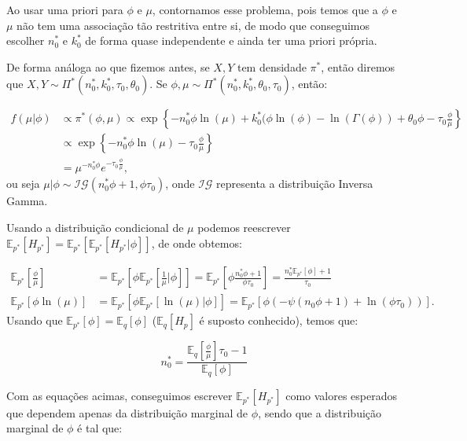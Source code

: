 \documentclass[
]{article}
\begin{document}
Ao usar uma priori para \(\phi\) e \(\mu\), contornamos esse problema,
pois temos que a \(\phi\) e \(\mu\) não tem uma associação tão
restritiva entre si, de modo que conseguimos escolher \(n^*_0\) e
\(k^*_0\) de forma quase independente e ainda ter uma priori própria.

De forma análoga ao que fizemos antes, se \(X,Y\) tem densidade
\(\pi^*\), então diremos que
\(X,Y \sim \Pi^*(n^*_0,k^*_0,\tau_0,\theta_0)\). Se
\(\phi, \mu \sim \Pi^*\left(n^*_0,k^*_0,\theta_0,\tau_0\right)\), então:

\[
\begin{aligned}
f(\mu|\phi)&\propto \pi^*(\phi,\mu) \propto \exp\left\{-n^*_0\phi \ln(\mu)+k^*_0(\phi\ln(\phi)-\ln(\Gamma(\phi))+\theta_0\phi-\tau_0\frac{\phi}{\mu}\right\}\\
& \propto \exp\left\{-n^*_0\phi \ln(\mu)-\tau_0\frac{\phi}{\mu}\right\}\\
&=\mu^{-n^*_0\phi}e^{-\tau_0\frac{\phi}{\mu}},
\end{aligned}
\] ou seja \(\mu|\phi \sim \mathcal{IG}(n^*_0 \phi+1,\phi\tau_0)\), onde
\(\mathcal{IG}\) representa a distribuição Inversa Gamma.

Usando a distribuição condicional de \(\mu\) podemos reescrever
\(\mathbb{E}_{p^*}[H_{p^*}]=\mathbb{E}_{p^*}[\mathbb{E}_{p^*}[H_{p^*}|\phi]]\),
de onde obtemos:

\[
\begin{aligned}
\mathbb{E}_{p^*}\left[\frac{\phi}{\mu}\right]&=\mathbb{E}_{p^*}[\phi\mathbb{E}_{p^*}\left[\frac{1}{\mu}|\phi\right]]=\mathbb{E}_{p^*}\left[\phi\frac{n^*_0\phi+1}{\phi \tau_0}\right]=\frac{n^*_0\mathbb{E}_{p^*}\left[\phi\right]+1}{ \tau_0}\\
\mathbb{E}_{p^*}[\phi\ln(\mu)]&=\mathbb{E}_{p^*}[\phi\mathbb{E}_{p^*}[\ln(\mu)|\phi]]=\mathbb{E}_{p^*}\left[\phi(-\psi(n_0 \phi +1 )+\ln(\phi\tau_0))\right].
 \end{aligned}
\] Usando que
\(\mathbb{E}_{p^*}\left[\phi\right]=\mathbb{E}_q\left[\phi\right]\)
(\(\mathbb{E}_q\left[H_p\right]\) é suposto conhecido), temos que:

\[
n^*_0=\frac{\mathbb{E}_q\left[\frac{\phi}{\mu}\right]\tau_0-1}{\mathbb{E}_q\left[\phi\right]}
\]

Com as equações acimas, conseguimos escrever
\(\mathbb{E}_{p^*}[H_{p^*}]\) como valores esperados que dependem apenas
da distribuição marginal de \(\phi\), sendo que a distribuição marginal
de \(\phi\) é tal que:
\end{document}
